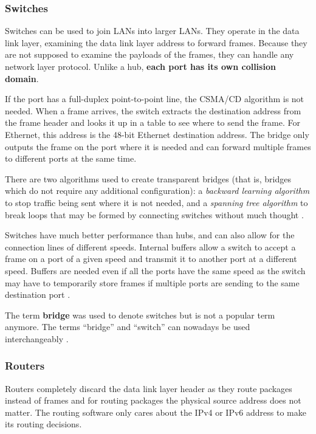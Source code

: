 \documentclass[12pt, oneside]{book}
\begin{document}
\subsubsection{Switches}

Switches can be used to join LANs into larger LANs.
They operate in the data link layer, examining the data link layer address to forward frames.
Because they are not supposed to examine the payloads of the frames, they can handle any network layer protocol.
Unlike a hub, \textbf{each port has its own collision domain}.

If the port has a full-duplex point-to-point line, the CSMA/CD algorithm is not needed.
When a frame arrives, the switch extracts the destination address from the frame header and looks it up in a table to see where to send the frame.
For Ethernet, this address is the 48-bit Ethernet destination address.
The bridge only outputs the frame on the port where it is needed and can forward multiple frames to different ports at the same time.

There are two algorithms used to create transparent bridges (that is, bridges which do not require any additional configuration): a \textit{backward learning algorithm} to stop traffic being sent where it is not needed, and a \textit{spanning tree algorithm} to break loops that may be formed by connecting switches without much thought \cite[p.~333]{computer-networks-tanenbaum-2012}.

Switches have much better performance than hubs, and can also allow for the connection lines of different speeds. Internal buffers allow a switch to accept a frame on a port of a given speed and transmit it to another port at a different speed. Buffers are needed even if all the ports have the same speed as the switch may have to temporarily store frames if multiple ports are sending to the same destination port \cite[p.~341]{computer-networks-tanenbaum-2012}.

The term \textbf{bridge} was used to denote switches but is not a popular term anymore. The terms ``bridge'' and ``switch'' can nowadays be used interchangeably \cite[p.~350]{computer-networks-tanenbaum-2012}.

\subsubsection{Routers}

Routers completely discard the data link layer header as they route packages instead of frames and for routing packages the physical source address does not matter.
The routing software only cares about the IPv4 or IPv6 address to make its routing decisions.
\end{document}
